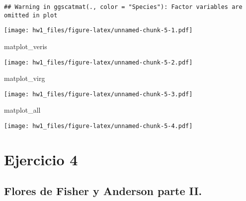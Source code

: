 \documentclass[
]{article}
\newenvironment{Shaded}{\begin{snugshade}}{\end{snugshade}}
\newcommand{\CommentTok}[1]{\textcolor[rgb]{0.56,0.35,0.01}{\textit{#1}}}
\newcommand{\NormalTok}[1]{#1}
\begin{document}
\begin{verbatim}
## Warning in ggscatmat(., color = "Species"): Factor variables are omitted in plot
\end{verbatim}

\begin{Shaded}
\end{Shaded}

\texttt{[image: hw1\_files/figure-latex/unnamed-chunk-5-1.pdf]}

\begin{Shaded}
\begin{Highlighting}[]
\NormalTok{matplot_veris}
\end{Highlighting}
\end{Shaded}

\texttt{[image: hw1\_files/figure-latex/unnamed-chunk-5-2.pdf]}

\begin{Shaded}
\begin{Highlighting}[]
\NormalTok{matplot_virg}
\end{Highlighting}
\end{Shaded}

\texttt{[image: hw1\_files/figure-latex/unnamed-chunk-5-3.pdf]}

\begin{Shaded}
\begin{Highlighting}[]
\NormalTok{matplot_all}
\end{Highlighting}
\end{Shaded}

\texttt{[image: hw1\_files/figure-latex/unnamed-chunk-5-4.pdf]}

\hypertarget{ejercicio-4}{%
\section{Ejercicio 4}\label{ejercicio-4}}

\hypertarget{flores-de-fisher-y-anderson-parte-ii.}{%
\subsection{Flores de Fisher y Anderson parte
II.}\label{flores-de-fisher-y-anderson-parte-ii.}}
\end{document}
